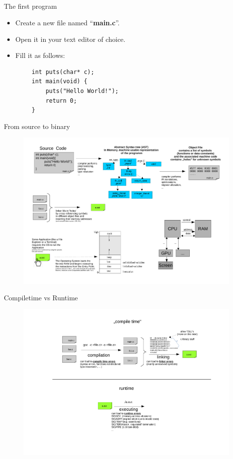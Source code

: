 \documentclass[10pt,graphics,aspectratio=169,table]{beamer}
\begin{document}
\subsection{}
\begin{frame}[fragile]{The first program}
	\begin{itemize}
		\item Create a new file named ``\textbf{main.c}''.
		\item Open it in your text editor of choice.
		\item Fill it as follows:
	\end{itemize}
	\begin{lstlisting}
        int puts(char* c);
        int main(void) {
            puts("Hello World!");
            return 0;
        }
    \end{lstlisting}
\end{frame}
\begin{frame}[fragile]{From source to binary}
    \begin{figure}
        \centering
        \includegraphics[width=0.8\linewidth]{res/FromSourceToBin.pdf}
    \end{figure}
\end{frame}
\begin{frame}[fragile]{Compiletime vs Runtime}
    \begin{figure}
        \centering
        \includegraphics[width=0.9\linewidth]{res/ComptimeRuntime.pdf}
    \end{figure}
\end{frame}
\end{document}
